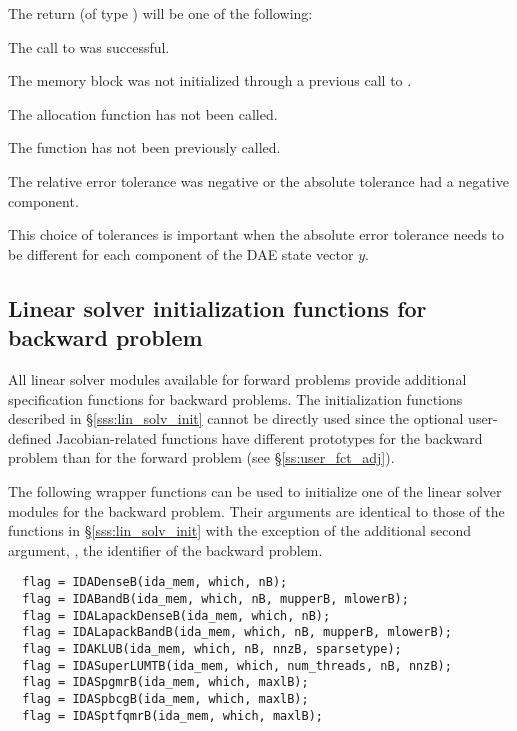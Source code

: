 {
  The return  (of type ) will be one of the following:
  \begin{args}
  \item[\Id{IDA\_SUCCESS}]
    The call to  was successful.
  \item[\Id{IDA\_MEM\_NULL}] 
    The {\idas} memory block was not initialized through a previous call to
    .
  \item[\Id{IDA\_NO\_MALLOC}] 
    The allocation function  has not been called.
  \item[\Id{IDA\_NO\_ADJ}]
    The function  has not been previously called.
  \item[\Id{IDA\_ILL\_INPUT}] 
    The relative error tolerance was negative or the absolute tolerance
    had a negative component.
  \end{args}
}
{
  This choice of tolerances is important when the absolute error tolerance needs to
  be different for each component of the DAE state vector $y$.
}

\subsection{Linear solver initialization functions for backward problem}
\label{sss:lin_solv_b}

All {\idas} linear solver modules available for forward problems
provide additional specification functions for backward problems.  The
initialization functions described in \S\ref{sss:lin_solv_init} cannot
be directly used since the optional user-defined Jacobian-related
functions have different prototypes for the backward problem than for
the forward problem (see \S\ref{ss:user_fct_adj}).

The following wrapper functions can be used to initialize one of the linear
solver modules for the backward problem. Their arguments are identical to those
of the functions in \S\ref{sss:lin_solv_init} with the exception of the additional
second argument, , the identifier of the backward problem.
\begin{verbatim}
  flag = IDADenseB(ida_mem, which, nB);
  flag = IDABandB(ida_mem, which, nB, mupperB, mlowerB);
  flag = IDALapackDenseB(ida_mem, which, nB);
  flag = IDALapackBandB(ida_mem, which, nB, mupperB, mlowerB);
  flag = IDAKLUB(ida_mem, which, nB, nnzB, sparsetype);
  flag = IDASuperLUMTB(ida_mem, which, num_threads, nB, nnzB);
  flag = IDASpgmrB(ida_mem, which, maxlB);
  flag = IDASpbcgB(ida_mem, which, maxlB);
  flag = IDASptfqmrB(ida_mem, which, maxlB);
\end{verbatim}

